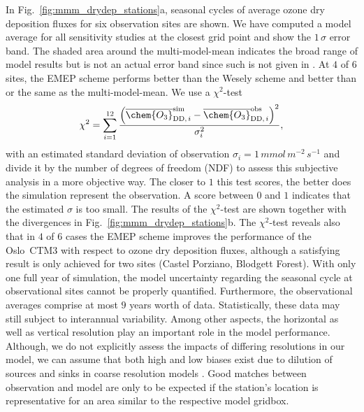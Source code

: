\documentclass[gmd, manuscript]{copernicus}
\begin{document}
In Fig.~\ref{fig:mmm_drydep_stations}a, seasonal cycles of average ozone dry deposition fluxes for six observation sites are shown. We have computed a model average for all sensitivity studies at the closest grid point and show the $1\,\sigma$ error band. The shaded area around the multi-model-mean indicates the broad range of model results but is not an actual error band since such is not given in \citet{ACP:Hardacre2015}. At $4$ of $6$ sites, the EMEP scheme performs better than the Wesely scheme and better than or the same as the multi-model-mean. We use a $\chi^2$-test
\begin{equation}
  \chi^2 = \sum_{i=1}^{12}\frac{\left(\overline{\chem{O_3}}_{\text{DD,\,}i}^\text{sim}-\overline{\chem{O_3}}_{\text{DD,\,}i}^\text{obs}\right)^2}{\sigma_i^2},
\end{equation}
with an estimated standard deviation of observation $\sigma_i=1\,\unit{mmol\,m^{-2}\,s^{-1}}$ and divide it by the number of degrees of freedom (NDF) to assess this subjective analysis in a more objective way. The closer to $1$ this test scores, the better does the simulation represent the observation. A score between $0$ and $1$ indicates that the estimated $\sigma$ is too small. The results of the $\chi^2$-test are shown together with the divergences in Fig.~\ref{fig:mmm_drydep_stations}b. The $\chi^2$-test reveals also that in $4$ of $6$ cases the EMEP scheme improves the performance of the Oslo~CTM3 with respect to ozone dry deposition fluxes, although a satisfying result is only achieved for two sites (Castel Porziano, Blodgett Forest).
With only one full year of simulation, the model uncertainty regarding the seasonal cycle at observational sites cannot be properly quantified. Furthermore, the observational averages comprise at most $9$ years worth of data. Statistically, these data may still subject to interannual variability. Among other aspects, the horizontal as well as vertical resolution play an important role in the model performance. Although, we do not explicitly assess the impacts of differing resolutions in our model, we can assume that both high and low biases exist due to dilution of sources and sinks in coarse resolution models \citep{AE:Schaap2015}. Good matches between observation and model are only to be expected if the station's location is representative for an area similar to the respective model gridbox.
\end{document}
